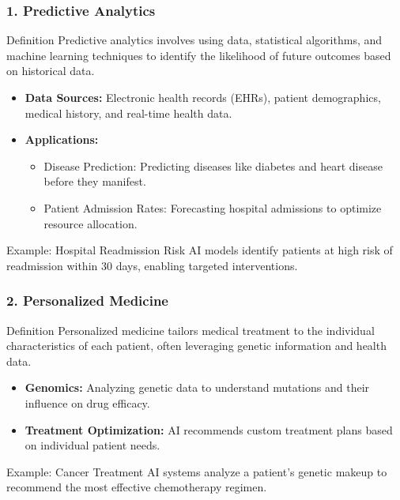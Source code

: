 \documentclass[aspectratio=169]{beamer}
\begin{document}
\begin{frame}[fragile]
  \frametitle{1. Predictive Analytics}
  \begin{block}{Definition}
      Predictive analytics involves using data, statistical algorithms, and machine learning techniques to identify the likelihood of future outcomes based on historical data.
  \end{block}
  
  \begin{itemize}
      \item \textbf{Data Sources:} Electronic health records (EHRs), patient demographics, medical history, and real-time health data.
      \item \textbf{Applications:}
      \begin{itemize}
          \item Disease Prediction: Predicting diseases like diabetes and heart disease before they manifest.
          \item Patient Admission Rates: Forecasting hospital admissions to optimize resource allocation.
      \end{itemize}
  \end{itemize}
  
  \pause
  
  \begin{block}{Example: Hospital Readmission Risk}
      AI models identify patients at high risk of readmission within 30 days, enabling targeted interventions.
  \end{block}
\end{frame}

\begin{frame}[fragile]
  \frametitle{2. Personalized Medicine}
  \begin{block}{Definition}
      Personalized medicine tailors medical treatment to the individual characteristics of each patient, often leveraging genetic information and health data.
  \end{block}
  
  \begin{itemize}
      \item \textbf{Genomics:} Analyzing genetic data to understand mutations and their influence on drug efficacy.
      \item \textbf{Treatment Optimization:} AI recommends custom treatment plans based on individual patient needs.
  \end{itemize}

  \pause
  
  \begin{block}{Example: Cancer Treatment}
      AI systems analyze a patient's genetic makeup to recommend the most effective chemotherapy regimen.
  \end{block}
\end{frame}
\end{document}
